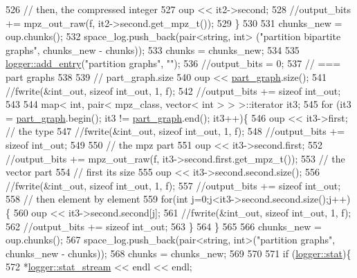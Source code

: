\begin{DoxyCode}
526     \textcolor{comment}{// then, the compressed integer}
527     oup << it2->second;
528     \textcolor{comment}{//output\_bits += mpz\_out\_raw(f, it2->second.get\_mpz\_t());}
529   \}
530 
531   chunks\_new = oup.chunks();
532   space\_log.push\_back(pair<string, int> (\textcolor{stringliteral}{"partition bipartite graphs"}, chunks\_new - chunks));
533   chunks = chunks\_new;
534 
535   \hyperlink{classlogger_a710163deb17bc81f70d53d285b8ac9ac}{logger::add\_entry}(\textcolor{stringliteral}{"partition graphs"}, \textcolor{stringliteral}{""});
536   \textcolor{comment}{//output\_bits = 0;}
537   \textcolor{comment}{// === part graphs}
538 
539   \textcolor{comment}{// part\_graph.size}
540   oup <<  \hyperlink{classmarked__graph__compressed_ae179a4737e6eab905c18a94d44ef64b7}{part\_graph}.size();
541   \textcolor{comment}{//fwrite(&int\_out, sizeof int\_out, 1, f);}
542   \textcolor{comment}{//output\_bits += sizeof int\_out;}
543 
544   map< int, pair< mpz\_class, vector< int > > >::iterator it3;
545   \textcolor{keywordflow}{for} (it3 = \hyperlink{classmarked__graph__compressed_ae179a4737e6eab905c18a94d44ef64b7}{part\_graph}.begin(); it3 != \hyperlink{classmarked__graph__compressed_ae179a4737e6eab905c18a94d44ef64b7}{part\_graph}.end(); it3++)\{
546     oup <<  it3->first; \textcolor{comment}{// the type}
547     \textcolor{comment}{//fwrite(&int\_out, sizeof int\_out, 1, f);}
548     \textcolor{comment}{//output\_bits += sizeof int\_out;}
549 
550     \textcolor{comment}{// the mpz part}
551     oup << it3->second.first;
552     \textcolor{comment}{//output\_bits += mpz\_out\_raw(f, it3->second.first.get\_mpz\_t());}
553     \textcolor{comment}{// the vector part}
554     \textcolor{comment}{// first its size}
555     oup <<  it3->second.second.size();
556     \textcolor{comment}{//fwrite(&int\_out, sizeof int\_out, 1, f);}
557     \textcolor{comment}{//output\_bits += sizeof int\_out;}
558     \textcolor{comment}{// then element by element}
559     \textcolor{keywordflow}{for}(\textcolor{keywordtype}{int} j=0;j<it3->second.second.size();j++)\{
560       oup <<  it3->second.second[j];
561       \textcolor{comment}{//fwrite(&int\_out, sizeof int\_out, 1, f);}
562       \textcolor{comment}{//output\_bits += sizeof int\_out;}
563     \}
564   \}
565 
566   chunks\_new = oup.chunks();
567   space\_log.push\_back(pair<string, int>(\textcolor{stringliteral}{"partition graphs"}, chunks\_new - chunks));
568   chunks = chunks\_new;
569 
570   
571   \textcolor{keywordflow}{if} (\hyperlink{classlogger_a26812b5ba03f130e8dae3446d5fc032f}{logger::stat})\{
572     *\hyperlink{classlogger_a7db37821f875f2ba3540980b355779f5}{logger::stat\_stream} << endl << endl;

\end{DoxyCode}
